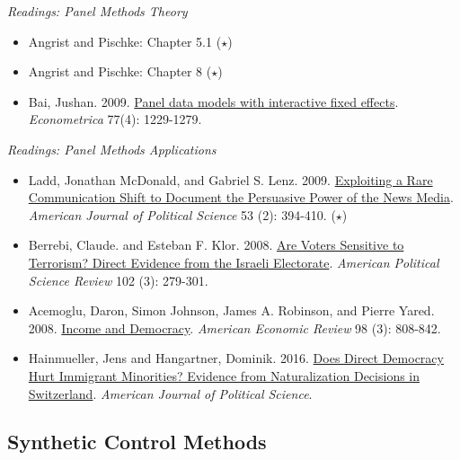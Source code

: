 \documentclass{article}
\begin{document}
\emph{Readings: Panel Methods Theory}
\begin{itemize}
\item  Angrist and Pischke: Chapter 5.1 ($\star$)
\item  Angrist and Pischke: Chapter 8 ($\star$)
\item Bai, Jushan. 2009. \href{http://www.jstor.org/stable/40263859}{Panel data models with interactive fixed effects}. \textit{Econometrica} 77(4): 1229-1279.
\end{itemize}

\emph{Readings: Panel Methods Applications}
\begin{itemize}
\item Ladd, Jonathan McDonald, and Gabriel S. Lenz. 2009.  \href{http://onlinelibrary.wiley.com/doi/10.1111/j.1540-5907.2009.00377.x/abstract} {Exploiting a Rare Communication Shift to Document the Persuasive Power of the News Media}. \textit{American Journal of Political Science} 53 (2): 394-410. ($\star$)
\item Berrebi, Claude. and Esteban F. Klor. 2008.  \href{http://journals.cambridge.org/abstract_S0003055408080246} {Are Voters Sensitive to Terrorism? Direct Evidence from the Israeli Electorate}. \textit{American Political Science Review} 102 (3): 279-301.
\item Acemoglu, Daron, Simon Johnson, James A. Robinson, and Pierre Yared. 2008. \href{http://www.nber.org/papers/w11205}{Income and Democracy}. \textit{American Economic Review} 98 (3): 808-842.
\item Hainmueller, Jens and Hangartner, Dominik. 2016. \href{http://papers.ssrn.com/sol3/papers.cfm?abstract_id=2022064}{Does Direct Democracy Hurt Immigrant Minorities? Evidence from Naturalization Decisions in Switzerland}. \textit{American Journal of Political Science}.

\end{itemize}

\subsection{Synthetic Control Methods}
\end{document}
